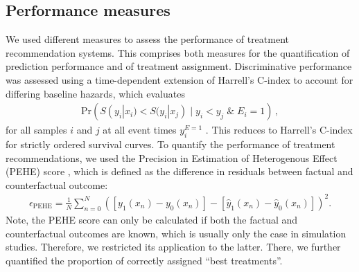 \documentclass{article}
\begin{document}
	\subsection{Performance measures}
	We used different measures to assess the performance of treatment recommendation systems. This comprises both measures for the quantification of prediction performance and of treatment assignment. Discriminative performance was assessed using a time-dependent extension of Harrell's C-index \cite{Harrell.1982} to account for differing baseline hazards, which evaluates 
	\begin{align}
	\text{Pr}\left(S(y_i|x_i) < S(y_i|x_j) \;|\; y_i<y_j\;\&\;E_i=1\right)\,,
		\end{align}
	for all samples $i$ and $j$ at all event times $y_i^{E=1}$ \cite{Antolini.2005}. 
	This reduces to Harrell's C-index for strictly ordered survival curves. To quantify the performance of treatment recommendations, we used the Precision in Estimation of Heterogenous Effect (PEHE) score \cite{Hill.2011}, which is defined as the difference in residuals between factual and counterfactual outcome:
	\begin{align*}
	\epsilon_{\text{PEHE}}=\frac{1}{N}\sum_{n=0}^{N}\left([y_1(x_n)-y_0(x_n)]-[\hat{y}_1(x_n)-\hat{y}_0(x_n)]\right)^2.
	\end{align*}
	Note, the PEHE score can only be calculated if both the factual and counterfactual outcomes are known, which is usually only the case in simulation studies. Therefore, we restricted its application to the latter. There, we further quantified the proportion of correctly assigned ``best treatments''. 
	
	
	
\end{document}
